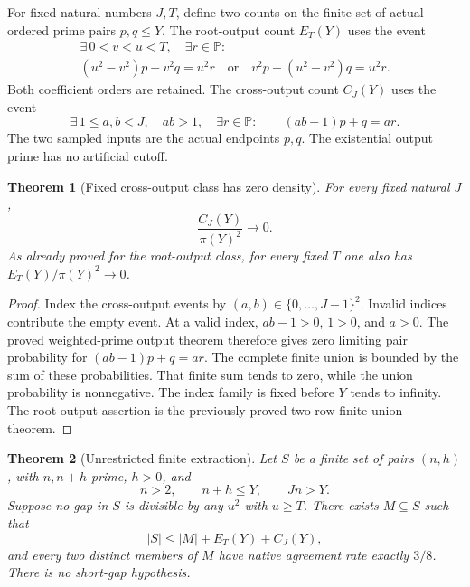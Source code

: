 \documentclass[11pt]{article}
\newtheorem{theorem}{Theorem}[section]
\begin{document}
For fixed natural numbers \(J,T\), define two counts on the
finite set of actual ordered prime pairs \(p,q\le Y\).
The root-output count \(E_T(Y)\) uses the event
\[
 \begin{gathered}
 \exists\,0<v<u<T,\quad \exists r\in\mathbb P:\qquad\\
 (u^2-v^2)p+v^2q=u^2r
 \quad\text{or}\quad
 v^2p+(u^2-v^2)q=u^2r .
 \end{gathered}
\]
Both coefficient orders are retained. The cross-output count
\(C_J(Y)\) uses the event
\[
 \exists\,1\le a,b<J,\quad ab>1,\quad \exists r\in\mathbb P:
 \qquad (ab-1)p+q=ar .
\]
The two sampled inputs are the actual endpoints \(p,q\).
The existential output prime has no artificial cutoff.

\begin{theorem}[Fixed cross-output class has zero density]
\label{thm:native-cross-output-zero}
For every fixed natural \(J\),
\[
 \frac{C_J(Y)}{\pi(Y)^2}\longrightarrow0.
\]
As already proved for the root-output class, for every
fixed \(T\) one also has \(E_T(Y)/\pi(Y)^2\to0\).
\end{theorem}

\begin{proof}
Index the cross-output events by \((a,b)\in
\{0,\ldots,J-1\}^2\). Invalid indices contribute the empty
event. At a valid index, \(ab-1>0\), \(1>0\), and \(a>0\).
The proved weighted-prime output theorem therefore gives
zero limiting pair probability for
\((ab-1)p+q=ar\).
The complete finite union is bounded by the sum of these
probabilities. That finite sum tends to zero, while the
union probability is nonnegative.
The index family is fixed before \(Y\) tends to infinity.
The root-output assertion is the previously proved
two-row finite-union theorem.
\end{proof}

\begin{theorem}[Unrestricted finite extraction]
\label{thm:native-unrestricted-sparse}
Let \(S\) be a finite set of pairs \((n,h)\), with
\(n,n+h\) prime, \(h>0\), and
\[
 n>2,\qquad n+h\le Y,\qquad Jn>Y.
\]
Suppose no gap in \(S\) is divisible by any \(u^2\) with
\(u\ge T\).
There exists \(M\subseteq S\) such that
\[
 |S|\le |M|+E_T(Y)+C_J(Y),
\]
and every two distinct members of \(M\) have native
agreement rate exactly \(3/8\).
There is no short-gap hypothesis.
\end{theorem}
\end{document}
